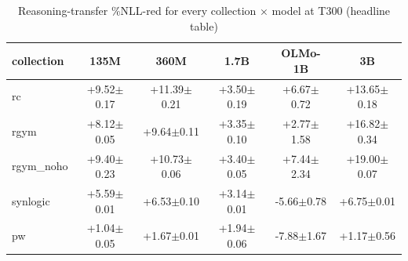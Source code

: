 \begin{table}[t]\centering
\caption{Reasoning-transfer \%NLL-red for every collection × model at T300 (headline table)}\label{tab:main_transfer_table}
\begin{tabular}{lccccc}
\toprule
collection & 135M & 360M & 1.7B & OLMo-1B & 3B \\
\midrule
rc & +9.52$\pm$0.17 & +11.39$\pm$0.21 & +3.50$\pm$0.19 & +6.67$\pm$0.72 & +13.65$\pm$0.18 \\
rgym & +8.12$\pm$0.05 & +9.64$\pm$0.11 & +3.35$\pm$0.10 & +2.77$\pm$1.58 & +16.82$\pm$0.34 \\
rgym\_noho & +9.40$\pm$0.23 & +10.73$\pm$0.06 & +3.40$\pm$0.05 & +7.44$\pm$2.34 & +19.00$\pm$0.07 \\
synlogic & +5.59$\pm$0.01 & +6.53$\pm$0.10 & +3.14$\pm$0.01 & -5.66$\pm$0.78 & +6.75$\pm$0.01 \\
pw & +1.04$\pm$0.05 & +1.67$\pm$0.01 & +1.94$\pm$0.06 & -7.88$\pm$1.67 & +1.17$\pm$0.56 \\
\bottomrule
\end{tabular}
\end{table}
